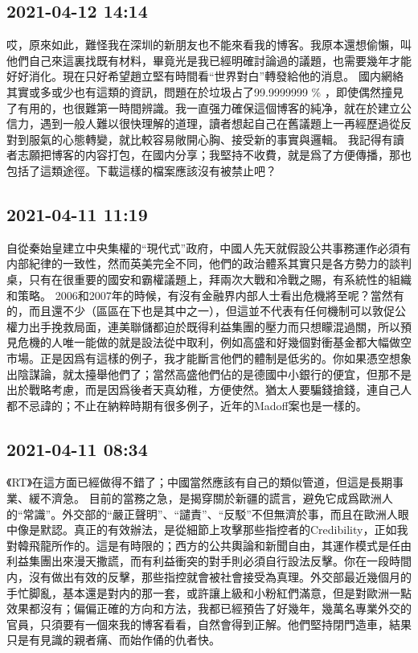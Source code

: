 \documentclass[twocolumn]{ctexart}
\begin{document}
\subsection*{2021-04-12 14:14}

哎，原來如此，難怪我在深圳的新朋友也不能來看我的博客。我原本還想偷懶，叫他們自己來這裏找既有材料，畢竟光是我已經明確討論過的議題，也需要幾年才能好好消化。現在只好希望趙立堅有時間看“世界對白”轉發給他的消息。
國内網絡其實或多或少也有這類的資訊，問題在於垃圾占了99.9999999 \% ，即使偶然撞見了有用的，也很難第一時間辨識。我一直强力確保這個博客的純净，就在於建立公信力，遇到一般人難以很快理解的道理，讀者想起自己在舊議題上一再經歷過從反對到服氣的心態轉變，就比較容易敞開心胸、接受新的事實與邏輯。
我記得有讀者志願把博客的内容打包，在國内分享；我堅持不收費，就是爲了方便傳播，那也包括了這類途徑。下載這樣的檔案應該沒有被禁止吧？
\subsection*{2021-04-11 11:19}

自從秦始皇建立中央集權的“現代式”政府，中國人先天就假設公共事務運作必須有内部紀律的一致性，然而英美完全不同，他們的政治體系其實只是各方勢力的談判桌，只有在很重要的國安和霸權議題上，拜兩次大戰和冷戰之賜，有系統性的組織和策略。
2006和2007年的時候，有沒有金融界内部人士看出危機將至呢？當然有的，而且還不少（區區在下也是其中之一），但這並不代表有任何機制可以敦促公權力出手挽救局面，連美聯儲都迫於既得利益集團的壓力而只想矇混過關，所以預見危機的人唯一能做的就是設法從中取利，例如高盛和好幾個對衝基金都大幅做空市場。正是因爲有這樣的例子，我才能斷言他們的體制是低劣的。你如果憑空想象出陰謀論，就太擡舉他們了；當然高盛他們佔的是德國中小銀行的便宜，但那不是出於戰略考慮，而是因爲後者天真幼稚，方便使然。猶太人要騙錢搶錢，連自己人都不忌諱的；不止在納粹時期有很多例子，近年的Madoff案也是一樣的。
\subsection*{2021-04-11 08:34}

《RT》在這方面已經做得不錯了；中國當然應該有自己的類似管道，但這是長期事業、緩不濟急。
目前的當務之急，是揭穿關於新疆的謊言，避免它成爲歐洲人的“常識”。外交部的“嚴正聲明”、“譴責”、“反駁”不但無濟於事，而且在歐洲人眼中像是默認。真正的有效辦法，是從細節上攻擊那些指控者的Credibility，正如我對韓飛龍所作的。這是有時限的；西方的公共輿論和新聞自由，其運作模式是任由利益集團出來漫天撒謊，而有利益衝突的對手則必須自行設法反擊。你在一段時間内，沒有做出有效的反擊，那些指控就會被社會接受為真理。外交部最近幾個月的手忙脚亂，基本還是對内的那一套，或許讓上級和小粉紅們滿意，但是對歐洲一點效果都沒有；偏偏正確的方向和方法，我都已經預告了好幾年，幾萬名專業外交的官員，只須要有一個來我的博客看看，自然會得到正解。他們堅持閉門造車，結果只是有見識的親者痛、而始作俑的仇者快。
\end{document}
